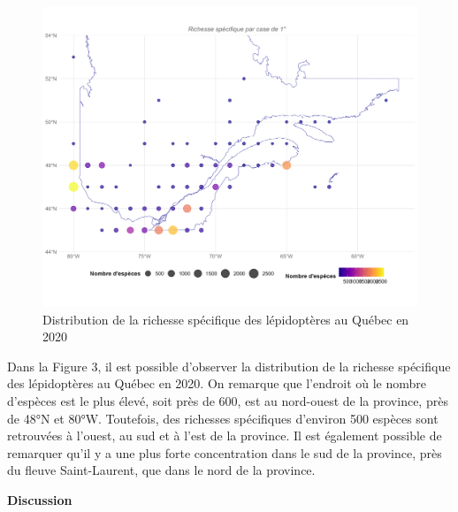 \documentclass[9pt,twocolumn,twoside,]{pnas-new}
\begin{document}
\begin{figure}[H]

{\centering \includegraphics[width=0.8\linewidth]{graphique_carte} 

}

\caption{Distribution de la richesse spécifique des lépidoptères au Québec en 2020}\label{fig:fig3}
\end{figure}

Dans la Figure 3, il est possible d'observer la distribution de la
richesse spécifique des lépidoptères au Québec en 2020. On remarque que
l'endroit où le nombre d'espèces est le plus élevé, soit près de 600,
est au nord-ouest de la province, près de 48°N et 80°W. Toutefois, des
richesses spécifiques d'environ 500 espèces sont retrouvées à l'ouest,
au sud et à l'est de la province. Il est également possible de remarquer
qu'il y a une plus forte concentration dans le sud de la province, près
du fleuve Saint-Laurent, que dans le nord de la province.

\vspace{10pt}

\textbf{Discussion }
\end{document}
